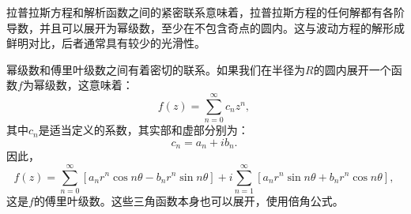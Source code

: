拉普拉斯方程和解析函数之间的紧密联系意味着，拉普拉斯方程的任何解都有各阶导数，并且可以展开为幂级数，至少在不包含奇点的圆内。这与波动方程的解形成鲜明对比，后者通常具有较少的光滑性。

幂级数和傅里叶级数之间有着密切的联系。如果我们在半径为\( R \)的圆内展开一个函数\( f \)为幂级数，这意味着：
\[
f(z) = \sum_{n=0}^{\infty} c_n z^n,~
\]
其中\( c_n \)是适当定义的系数，其实部和虚部分别为：
\[
c_n = a_n + i b_n.~
\]
因此，
\[
f(z) = \sum_{n=0}^{\infty} \left[ a_n r^n \cos n\theta - b_n r^n \sin n\theta \right] + i \sum_{n=1}^{\infty} \left[ a_n r^n \sin n\theta + b_n r^n \cos n\theta \right],~
\]
这是\( f \)的傅里叶级数。这些三角函数本身也可以展开，使用倍角公式。